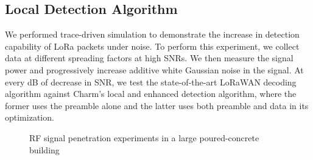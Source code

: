 \subsection{Local Detection Algorithm}
\label{sec:local-detection-eval}

We performed trace-driven simulation to demonstrate the increase in detection
capability of LoRa packets under noise. To perform this experiment, we collect
data at different spreading factors at high SNRs. We then measure the signal
power and progressively increase additive white Gaussian noise in the signal.
At every dB of decrease in SNR, we test the state-of-the-art LoRaWAN decoding
algorithm against Charm's local and enhanced detection algorithm, where the
former uses the preamble alone and the latter uses both preamble and data in
its optimization.

\begin{figure}[!t]
\centering
\vspace{-20pt}
\hfill
{}
\vspace{-10pt}
\caption{RF signal penetration experiments in a large poured-concrete building}
\label{fig:penetration-test}
\compactimg
\end{figure}

